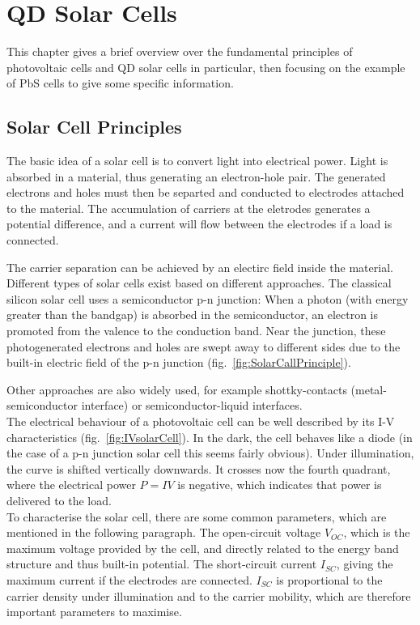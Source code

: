 \chapter{QD Solar Cells}

This chapter gives a brief overview over the fundamental principles of photovoltaic cells and QD solar cells in particular, then focusing on the example of PbS cells to give some specific information.

\section{Solar Cell Principles}

The basic idea of a solar cell is to convert light into electrical power. Light is absorbed in a material, thus generating an electron-hole pair. The generated electrons and holes must then be separted and conducted to electrodes attached to the material. The accumulation of carriers at the eletrodes generates a potential difference, and a current will flow between the electrodes if a load is connected.

The carrier separation can be achieved by an electirc field inside the material. Different types of solar cells exist based on different approaches. The classical silicon solar cell uses a semiconductor p-n junction: When a photon (with energy greater than the bandgap) is absorbed in the semiconductor, an electron is promoted from the valence to the conduction band. Near the junction, these photogenerated electrons and holes are swept away to different sides due to the built-in electric field of the p-n junction (fig.~\ref{fig:SolarCallPrinciple}). 

Other approaches are also widely used, for example shottky-contacts (metal-semiconductor interface) or semiconductor-liquid interfaces.\\

The electrical behaviour of a photovoltaic cell can be well described by its I-V characteristics (fig.~\ref{fig:IVsolarCell}). In the dark, the cell behaves like a diode (in the case of a p-n junction solar cell this seems fairly obvious). Under illumination, the curve is shifted vertically downwards. It crosses now the fourth quadrant, where the electrical power $P=IV$ is negative, which indicates that power is delivered to the load.\\

To characterise the solar cell, there are some common parameters, which are mentioned in the following paragraph. The open-circuit voltage $V_{OC}$, which is the maximum voltage provided by the cell, and directly related to the energy band structure and thus built-in potential. The short-circuit current $I_{SC}$, giving the maximum current if the electrodes are connected. $I_{SC}$ is proportional to the carrier density under illumination and to the carrier mobility, which are therefore important parameters to maximise.

